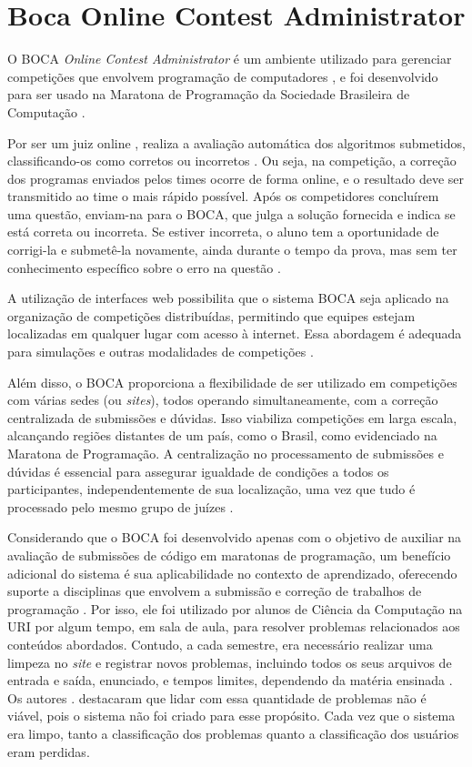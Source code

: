 \section{Boca Online Contest Administrator}

O BOCA \textit{Online Contest Administrator} é um ambiente utilizado para gerenciar competições que envolvem programação de computadores \cite[p.~22]{galasso}, e foi desenvolvido para ser usado na Maratona de Programação da Sociedade Brasileira de Computação \cite[p.~2]{camposferreira}.

Por ser um juiz online \cite[p.~1]{beztonin2012}, realiza a avaliação automática dos algoritmos submetidos, classificando-os como corretos ou incorretos \cite[p.~22]{galasso}. Ou seja, na competição, a correção dos programas enviados pelos times ocorre de forma online, e o resultado deve ser transmitido ao time o mais rápido possível. Após os competidores concluírem uma questão, enviam-na para o BOCA, que julga a solução fornecida e indica se está correta ou incorreta. Se estiver incorreta, o aluno tem a oportunidade de corrigi-la e submetê-la novamente, ainda durante o tempo da prova, mas sem ter conhecimento específico sobre o erro na questão \cite[p.~4]{camposferreira}. 

A utilização de interfaces web possibilita que o sistema BOCA seja aplicado na organização de competições distribuídas, permitindo que equipes estejam localizadas em qualquer lugar com acesso à internet. Essa abordagem é adequada para simulações e outras modalidades de competições \cite[p.~20]{camposferreira}.
 
Além disso, o BOCA proporciona a flexibilidade de ser utilizado em competições com várias sedes (ou \textit{sites}), todos operando simultaneamente, com a correção centralizada de submissões e dúvidas. Isso viabiliza competições em larga escala, alcançando regiões distantes de um país, como o Brasil, como evidenciado na Maratona de Programação. A centralização no processamento de submissões e dúvidas é essencial para assegurar igualdade de condições a todos os participantes, independentemente de sua localização, uma vez que tudo é processado pelo mesmo grupo de juízes \cite[p.~10-11]{camposferreira}.

Considerando que o BOCA foi desenvolvido apenas com o objetivo de auxiliar na avaliação de submissões de código em maratonas de programação, um benefício adicional do sistema é sua aplicabilidade no contexto de aprendizado, oferecendo suporte a disciplinas que envolvem a submissão e correção de trabalhos de programação \cite[p.~2]{camposferreira}. Por isso, ele foi utilizado por alunos de Ciência da Computação na URI por algum tempo, em sala de aula, para resolver problemas relacionados aos conteúdos abordados. Contudo, a cada semestre, era necessário realizar uma limpeza no \textit{site} e registrar novos problemas, incluindo todos os seus arquivos de entrada e saída, enunciado, e tempos limites, dependendo da matéria ensinada \cite[p.~1]{beztonin2012}. Os autores \textcite[p.~1]{beztonin2012}. destacaram que lidar com essa quantidade de problemas não é viável, pois o sistema não foi criado para esse propósito. Cada vez que o sistema era limpo, tanto a classificação dos problemas quanto a classificação dos usuários eram perdidas.

